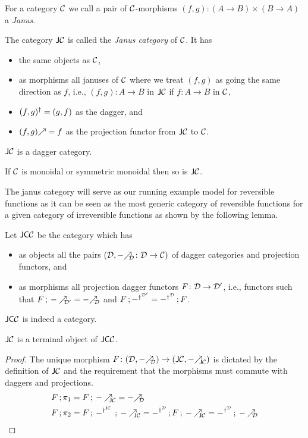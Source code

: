 \documentclass[runningheads,envcountsame]{llncs}
\begin{document}
    \begin{definition}
        For a category $\mathcal{C}$ we call a pair of $\mathcal{C}$-morphisms $(f, g)\colon (A \to B) \times (B \to A)$ a \emph{Janus}. 
        
        The category $\mathsf{J}\mathcal{C}$ is called the \emph{Janus category} of $\mathcal{C}$. It has 
        \begin{itemize}
            \item the same objects as $\mathcal{C}$,
            \item as morphisms all januses of $\mathcal{C}$ where we treat $(f, g)$ as going the same direction as $f$, i.e., $(f, g)\colon A \to B$ in $\mathsf{J}\mathcal{C}$ if $f\colon A \to B$ in $\mathcal{C}$,
            \item $\rev{(f, g)} = (g, f)$ as the dagger, and
            \item $\f{(f, g)} = f$ as the projection functor from $\mathsf{J}\mathcal{C}$ to $\mathcal{C}$.
        \end{itemize}
    \end{definition}
    \begin{proposition}
        $\mathsf{J}\mathcal{C}$ is a dagger category.
        
        If $\mathcal{C}$ is monoidal or symmetric monoidal then so is $\mathsf{J}\mathcal{C}$.
    \end{proposition}
    
    The janus category will serve as our running example model for reversible functions as it can be seen as the most generic category of reversible functions for a given category of irreversible functions as shown by the following lemma.
    
    \begin{definition}
        Let $\mathsf{JC}\mathcal{C}$ be the category which has 
        \begin{itemize}
            \item as objects all the pairs $(\D, \f[\D]{-}\colon \D \to \C)$ of dagger categories and projection functors, and
            \item as morphisms all projection dagger functors $F\colon \mathcal{D} \to \mathcal{D}'$, i.e., functors such that $\comp{F}{\f[\D']{-}} = \f[\D]{-}$ and $\comp{F}{\rev[\D']{-}} = \comp{\rev[\D]{-}}{F}$.
        \end{itemize}
    \end{definition}
    \begin{proposition}
        $\mathsf{JC}\mathcal{C}$ is indeed a category.
    \end{proposition}
    \begin{lemma}
        $\mathsf{J}\mathcal{C}$ is a terminal object of $\mathsf{JC}\mathcal{C}$.
    \end{lemma}
    \begin{proof}
        The unique morphism $F\colon (\D, \f[\D]{-}) \to (\JC, \f[\JC]{-})$ is dictated by the definition of $\mathsf{J}\mathcal{C}$ and the requirement that the morphisms must commute with daggers and projections.
        \begin{align*}
            \comp{F}{\pi_1} &= \comp{F}{\f[\JC]{-}} = \f[\D]{-} \\
            \comp{F}{\pi_2} &= \comp{F}{\comp{\rev[\JC]{-}}{\f[\JC]{-}}} = \comp{\rev[\D]{-}}{\comp{F}{\f[\JC]{-}}} = \comp{\rev[\D]{-}}{\f[\D]{-}}
        \end{align*}
    \end{proof}
    
\end{document}
